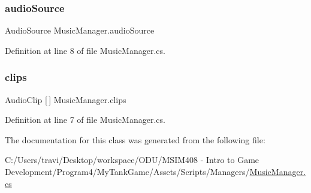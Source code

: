 \subsubsection{\texorpdfstring{audio\+Source}{audioSource}}
{\footnotesize\ttfamily Audio\+Source Music\+Manager.\+audio\+Source}



Definition at line 8 of file Music\+Manager.\+cs.

\mbox{\label{class_music_manager_a148545cd355044db2b30aae30b678e95}} 
\subsubsection{\texorpdfstring{clips}{clips}}
{\footnotesize\ttfamily Audio\+Clip \mbox{[}$\,$\mbox{]} Music\+Manager.\+clips}



Definition at line 7 of file Music\+Manager.\+cs.



The documentation for this class was generated from the following file\+:\begin{DoxyCompactItemize}
\item 
C\+:/\+Users/travi/\+Desktop/workspace/\+O\+D\+U/\+M\+S\+I\+M408 -\/ Intro to Game Development/\+Program4/\+My\+Tank\+Game/\+Assets/\+Scripts/\+Managers/\hyperlink{_music_manager_8cs}{Music\+Manager.\+cs}\end{DoxyCompactItemize}
